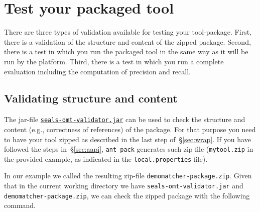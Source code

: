 \documentclass{article}
\def\file#1{\textcolor{grayy}{\texttt{#1}}}
\begin{document}
\section{Test your packaged tool}
\label{sec:test}

There are three types of validation available for testing your tool-package. First, there is a validation of the structure and content of the zipped package. Second, there is a test in which you run the packaged tool in the same way as it will be run by the platform. Third, there is a test in which you run a complete evaluation including the computation of precision and recall. 

\subsection{Validating structure and content}
\label{sub:test-structure}

The jar-file \href{http://oaei.ontologymatching.org/2011/tutorial/seals-omt-validator.jar}{\nolinkurl{seals-omt-validator.jar}} can be used to check the structure and content (e.g., correctness of references) of the package. For that purpose you need to have your tool zipped as described in the last step of~\S\ref{sec:wrap}. If you have followed the steps in~\S\ref{sec:aapi}, \verb|ant pack| generates such zip file (\file{mytool.zip} in the provided example, as indicated in the \file{local.properties} file). 

In our example we called the resulting zip-file \file{demomatcher-package.zip}. Given that in the current working directory we have \file{seals-omt-validator.jar} and \file{demomatcher-package.zip}, we can check the zipped package with the following command.
\end{document}

